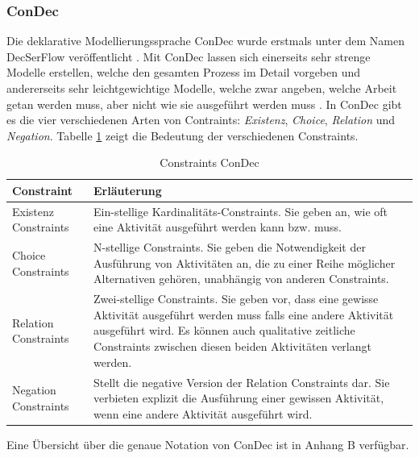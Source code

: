 \subsubsection{ConDec}

Die deklarative Modellierungssprache ConDec wurde erstmals unter dem Namen DecSerFlow veröffentlicht \cite{fahland2010}. Mit ConDec lassen sich einerseits sehr strenge Modelle erstellen, welche den gesamten Prozess im Detail vorgeben und andererseits sehr leichtgewichtige Modelle, welche zwar angeben, welche Arbeit getan werden muss, aber nicht wie sie ausgeführt werden muss \cite{pesic2006}. \newline
In ConDec gibt es die vier verschiedenen Arten von Contraints: \textit{Existenz}, \textit{Choice}, \textit{Relation} und \textit{Negation}. Tabelle \ref{tab:tab3} zeigt die Bedeutung der verschiedenen Constraints. \newline

\begin{table}
\begin{tabular}{|p{}|p{}|}
\hline
\textbf{Constraint} & \textbf{Erläuterung}\\
\hline
Existenz Constraints & Ein-stellige Kardinalitäts-Constraints. Sie geben an, wie oft eine Aktivität ausgeführt werden kann bzw. muss.\\
\hline
Choice Constraints & N-stellige Constraints. Sie geben die Notwendigkeit der Ausführung von Aktivitäten an, die zu einer Reihe möglicher Alternativen gehören, unabhängig von anderen Constraints. \\
\hline
Relation Constraints & Zwei-stellige Constraints. Sie geben vor, dass eine gewisse Aktivität ausgeführt werden muss falls eine andere Aktivität ausgeführt wird. Es können auch qualitative zeitliche Constraints zwischen diesen beiden Aktivitäten verlangt werden.\\
\hline
Negation Constraints & Stellt die negative Version der Relation Constraints dar. Sie verbieten explizit die Ausführung einer gewissen Aktivität, wenn eine andere Aktivität ausgeführt wird.\\
\hline
 \end{tabular}
  \caption{Constraints ConDec \cite{pesic2006}}
\label{tab:tab3}
 \end{table}
 Eine Übersicht über die genaue Notation von ConDec ist in Anhang B verfügbar.


